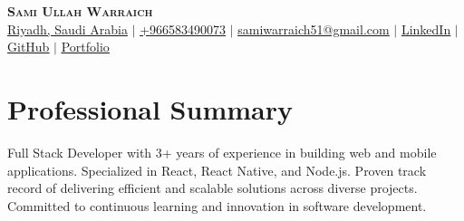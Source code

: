 \documentclass[letterpaper,11pt]{article}
\begin{document}

\begin{center}
    \textbf{\Huge \scshape Sami Ullah Warraich} \\ \vspace{1pt}
    \small 
    {\underline{Riyadh, Saudi Arabia}} $|$ 
    \href{https://wa.me/+966583490073}{\underline{+966583490073}} $|$ 
    \href{mailto:samiwarraich51@gmail.com}{\underline{samiwarraich51@gmail.com}} $|$ 
    \href{https://linkedin.com/in/samiwarra1ch}{\underline{LinkedIn}} $|$
    \href{https://github.com/samiwarraich}{\underline{GitHub}} 
    $|$ \href{https://sami.warraich.co}{\underline{Portfolio}}
\end{center}



\section{Professional Summary}
    \begin{itemize}[leftmargin=0.15in, label={}]
    \small{\item{
     {Full Stack Developer with 3+ years of experience in building web and mobile applications. Specialized in React, React Native, and Node.js. Proven track record of delivering efficient and scalable solutions across diverse projects. Committed to continuous learning and innovation in software development.} 
    }}
 \end{itemize}




\end{document}
